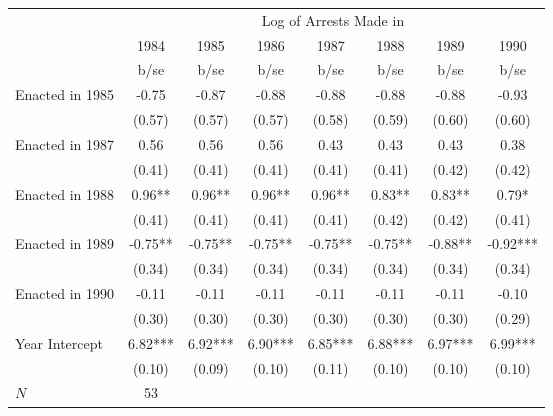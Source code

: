 {
\def\sym#1{\ifmmode^{#1}\else\(^{#1}\)\fi}
\begin{tabular}{l*{7}{c}}
\hline\hline
            &\multicolumn{7}{c}{Log of Arrests Made in}                                                                     \\
            &        1984   &        1985   &        1986   &        1987   &        1988   &        1989   &        1990   \\
            &        b/se   &        b/se   &        b/se   &        b/se   &        b/se   &        b/se   &        b/se   \\
\hline
Enacted in 1985&       -0.75   &       -0.87   &       -0.88   &       -0.88   &       -0.88   &       -0.88   &       -0.93   \\
            &      (0.57)   &      (0.57)   &      (0.57)   &      (0.58)   &      (0.59)   &      (0.60)   &      (0.60)   \\
Enacted in 1987&        0.56   &        0.56   &        0.56   &        0.43   &        0.43   &        0.43   &        0.38   \\
            &      (0.41)   &      (0.41)   &      (0.41)   &      (0.41)   &      (0.41)   &      (0.42)   &      (0.42)   \\
Enacted in 1988&        0.96** &        0.96** &        0.96** &        0.96** &        0.83** &        0.83** &        0.79*  \\
            &      (0.41)   &      (0.41)   &      (0.41)   &      (0.41)   &      (0.42)   &      (0.42)   &      (0.41)   \\
Enacted in 1989&       -0.75** &       -0.75** &       -0.75** &       -0.75** &       -0.75** &       -0.88** &       -0.92***\\
            &      (0.34)   &      (0.34)   &      (0.34)   &      (0.34)   &      (0.34)   &      (0.34)   &      (0.34)   \\
Enacted in 1990&       -0.11   &       -0.11   &       -0.11   &       -0.11   &       -0.11   &       -0.11   &       -0.10   \\
            &      (0.30)   &      (0.30)   &      (0.30)   &      (0.30)   &      (0.30)   &      (0.30)   &      (0.29)   \\
Year Intercept&        6.82***&        6.92***&        6.90***&        6.85***&        6.88***&        6.97***&        6.99***\\
            &      (0.10)   &      (0.09)   &      (0.10)   &      (0.11)   &      (0.10)   &      (0.10)   &      (0.10)   \\
\hline
\(N\)       &          53   &               &               &               &               &               &               \\
\hline\hline
\end{tabular}
}
